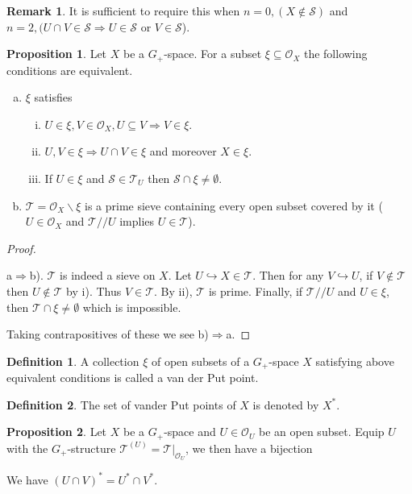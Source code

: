 \documentclass[10pt]{article}
\numberwithin{equation}{section}
\theoremstyle{definition}
\newtheorem{proposition}{Proposition}[subsection]
\newtheorem{definition}{Definition}[subsection]
\newtheorem{remark}{Remark}[subsection]
\newcommand{\Ouv}{\mathscr{O}}
\newcommand{\sep}[0]{\:|\:}
\newcommand{\sS}[0]{\mathscr{S}}
\newcommand{\sT}[0]{\mathscr{T}}
\begin{document}
\begin{remark}
    It is sufficient to require this when $n=0,(X\not\in\sS)$ and $n=2,(U\cap V\in\sS\Rightarrow U\in\sS$ or $V\in\sS$).
\end{remark}
\begin{proposition}
    \label{proposition_9_3}
    Let $X$ be a $G_+$-space. For a subset $\xi\subseteq\Ouv_X$ the following conditions are equivalent.
    \begin{enumerate}[a.]
        \item $\xi$ satisfies
            \begin{enumerate}[i.]
                \item $U\in\xi,V\in\Ouv_X,U\subseteq V\Rightarrow V\in\xi$.
                \item $U,V\in\xi\Rightarrow U\cap V\in\xi$ and moreover $X\in\xi$.
                \item If $U\in\xi$ and $\sS\in\mathcal{T}_U$ then $\sS\cap\xi\not=\emptyset$.
            \end{enumerate}
        \item $\mathscr{T}=\Ouv_X\backslash\xi$ is a prime sieve containing every open subset covered by it ($U\in\Ouv_X$ and $\mathscr{T}//U$ implies $U\in\mathscr{T}$).
    \end{enumerate}
\end{proposition}
\begin{proof}$\:$
    \par a$\Rightarrow$b). $\sT$ is indeed a sieve on $X$. Let $U\hookrightarrow X\in \sT$. Then for any $V\hookrightarrow U$, if $V\not\in \sT$ then $U\not\in\sT$ by i). Thus $V\in\sT$.
    By ii), $\sT$ is prime. Finally, if $\sT// U$ and $U\in\xi$, then $\sT\cap\xi\not=\emptyset$ which is impossible.
    \par Taking contrapositives of these we see b)$\Rightarrow$a.
\end{proof}
\begin{definition}
    \label{definition_9_9}
    A collection $\xi$ of open subsets of a $G_+$-space $X$ satisfying above equivalent conditions is called a van der Put point.
\end{definition}
\begin{definition}
    \label{definition_9_10}
    The set of vander Put points of $X$ is denoted by $X^*$.
\end{definition}
\begin{proposition}
    \label{fact_9_2}
    Let $X$ be a $G_+$-space and $U\in\Ouv_U$ be an open subset. Equip $U$ with the $G_+$-structure $\mathcal{T}^{(U)}=\mathcal{T}|_{\Ouv_U}$, we then have a bijection
    \begin{center}
    \end{center}
    We have $(U\cap V)^*=U^*\cap V^*$.
\end{proposition}
\end{document}
